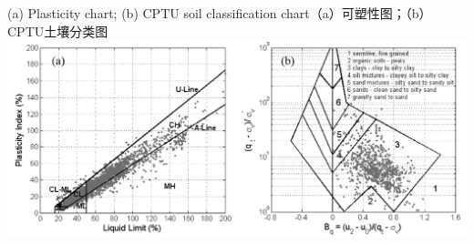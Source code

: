 \begin{BiliFigure}[crosscolumn=true,label=figure:bilingual-figure-example][htb]{(a) Plasticity chart; (b) CPTU soil classification chart}{（a）可塑性图；（b）CPTU土壤分类图}     
    \includegraphics[width=0.80\linewidth]{figures/figure-1.png}
\end{BiliFigure}